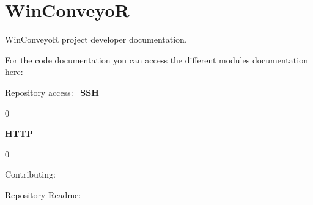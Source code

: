 \chapter{Win\+ConveyoR}
\hypertarget{index}{}\label{index}
Win\+ConveyoR project developer documentation.

For the code documentation you can access the different modules documentation here\+:
\begin{DoxyItemize}
\item {}
\item {}
\item {}
\end{DoxyItemize}

Repository access\+:~\newline
 {\bfseries{SSH}} 
\begin{DoxyCode}{0}

\end{DoxyCode}


{\bfseries{HTTP}} 
\begin{DoxyCode}{0}

\end{DoxyCode}


Contributing\+:~\newline

\begin{DoxyItemize}
\item {}
\end{DoxyItemize}

Repository Readme\+:~\newline

\begin{DoxyItemize}
\item {} 
\end{DoxyItemize}



